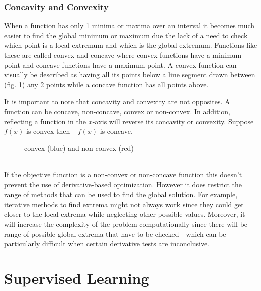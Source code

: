 \documentclass[10pt,a4paper]{report}
\begin{document}
			\subsection{Concavity and Convexity}
				When a function has only 1 minima or maxima over an interval it becomes much easier to find the global minimum
				or maximum due the lack of a need to check which point is a local extremum and which is the global extremum. Functions like these are
				called convex and concave where convex functions have a minimum point and concave functions have a maximum point.
				A convex function \autocite{vandenberghe2004convex} can visually be described as having all its points below a line segment drawn
				between (fig. \ref{fig:convexity}) any 2 points while a concave function has all points above. \par
				It is important to note that concavity and convexity are not opposites. A function can be concave, non-concave, convex or non-convex.
				In addition, reflecting a function in the $x$-axis will reverse its concavity or convexity. Suppose $f(x)$ is convex then $-f(x)$ is concave.
				\begin{figure}[h]
					\centering
					\caption{convex (blue) and non-convex (red)}
					\label{fig:convexity}
				\end{figure} \\
				If the objective function is a non-convex or non-concave function this doesn't prevent the use of derivative-based optimization. However
				it does restrict the range of methods that can be used to find the global solution. For example, iterative methods to find extrema might not always work
				since they could get closer to the local extrema while neglecting other possible values. Moreover, it will increase the complexity of the problem
				computationally since there will be range of possible global extrema that have to be checked - which can be particularly difficult when
				certain derivative tests are inconclusive.

	\chapter{Supervised Learning}
\end{document}

